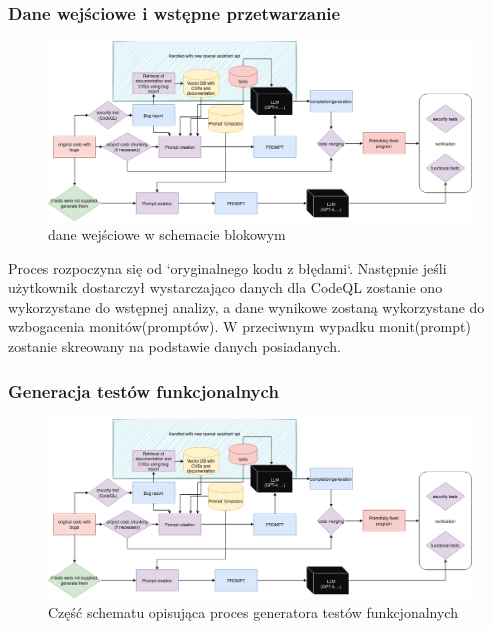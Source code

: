 \subsubsection{Dane wejściowe i wstępne przetwarzanie}
\begin{figure}[h]
    \centering
    \includegraphics[clip, trim=0cm 4cm 29cm 6cm, width=0.9\linewidth]{img/gptester.drawio.png}
    \caption{dane wejściowe w schemacie blokowym}
    \label{fig:przyciety_obraz}
\end{figure}
Proces rozpoczyna się od `oryginalnego kodu z błędami`. Następnie jeśli użytkownik dostarczył wystarczająco danych dla CodeQL zostanie ono wykorzystane do wstępnej analizy, a dane wynikowe zostaną wykorzystane do wzbogacenia monitów(promptów). 
W przeciwnym wypadku monit(prompt) zostanie skreowany na podstawie danych posiadanych. 

\subsubsection{Generacja testów funkcjonalnych}
\begin{figure}[h]
    \centering
    \includegraphics[clip, trim=0cm 0cm 0cm 13cm, width=0.9\linewidth]{img/gptester.drawio.png}
    \caption{Część schematu opisująca proces generatora testów funkcjonalnych}
    \label{fig:przyciety_obraz}
\end{figure}

